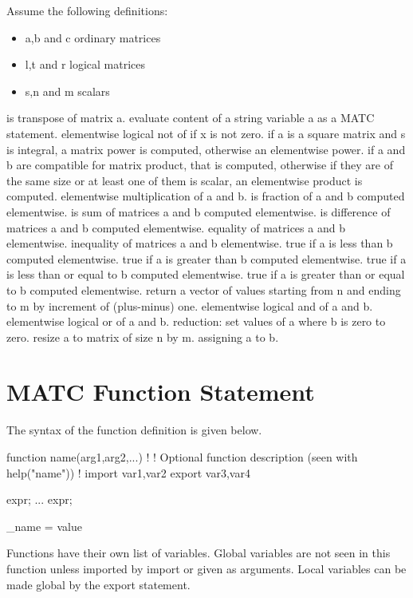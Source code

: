 Assume the following definitions:
\begin{itemize}
\item a,b and c ordinary matrices  
\item l,t and r logical matrices 
\item s,n and m scalars 
\end{itemize}

\sifbegin
{} is transpose of matrix a. 
 evaluate content of a string variable a as a MATC statement. 
 elementwise logical not of  if x is not zero. 
 if a is a square matrix and s is integral, a matrix power is computed, otherwise an elementwise power. 
 if a and b are compatible for matrix product, that is computed, 
otherwise if they are of the same size or at least one of them is scalar, an elementwise product is computed. 
elementwise multiplication of a and b.  
 is fraction of a and b computed elementwise. 
 is sum of matrices a and b computed elementwise. 
 is difference of matrices a and b computed elementwise. 
 equality of matrices a and b elementwise.  
 inequality of matrices a and b elementwise.  
 true if a is less than b computed elementwise. 
 true if a is greater than b computed elementwise.
 true if a is less than or equal to b computed elementwise. 
 true if a is greater than or equal to b computed elementwise. 
 return a vector of values starting from n and ending to m by increment of (plus-minus) one.  
 elementwise logical and of a and b. 
 elementwise logical or of a and b. 
 reduction: set values of a where b is zero to zero. 
 resize a to matrix of size n by m. 
 assigning a to b. 
\sifend


\section{MATC Function Statement}


The syntax of the function definition is given below. 

\ttbegin
function name(arg1,arg2,...)
!
! Optional function description (seen with help("name"))
!
import var1,var2
export var3,var4
{
    expr;
     ...
    expr;

    \_name = value
}
\ttend

Functions have their own list of variables. Global variables are not seen in this 
function unless imported by import or given as arguments. Local variables can be made global by the export statement. 

